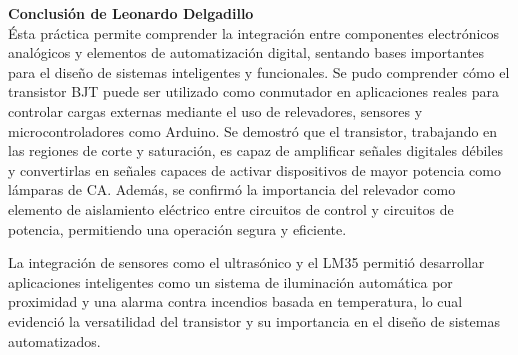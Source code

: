 \textbf{Conclusión de Leonardo Delgadillo}\\
\noindent Ésta práctica permite comprender la integración entre componentes electrónicos analógicos y elementos de automatización digital, sentando bases importantes para el diseño de sistemas inteligentes y funcionales. 
Se pudo comprender cómo el transistor BJT puede ser utilizado como conmutador en aplicaciones reales para controlar cargas externas mediante el uso de relevadores, sensores y microcontroladores como Arduino. Se demostró que el transistor, trabajando en las regiones de corte y saturación, es capaz de amplificar señales digitales débiles y convertirlas en señales capaces de activar dispositivos de mayor potencia como lámparas de CA. Además, se confirmó la importancia del relevador como elemento de aislamiento eléctrico entre circuitos de control y circuitos de potencia, permitiendo una operación segura y eficiente.

La integración de sensores como el ultrasónico y el LM35 permitió desarrollar aplicaciones inteligentes como un sistema de iluminación automática por proximidad y una alarma contra incendios basada en temperatura, lo cual evidenció la versatilidad del transistor y su importancia en el diseño de sistemas automatizados.

\vspace{10mm}